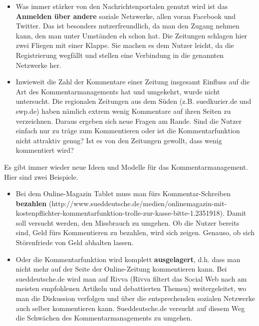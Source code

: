 \begin{itemize}
\item Was immer stärker von den Nachrichtenportalen genutzt wird ist das
{\bfseries Anmelden über andere} soziale Netzwerke, allen voran Facebook und Twitter. Das ist besonders nutzerfreundlich, da man den Zugang nehmen kann, den man unter Umständen eh schon hat. Die Zeitungen schlagen hier zwei Fliegen mit einer Klappe. Sie machen es dem Nutzer leicht, da die Registrierung wegfällt und stellen eine Verbindung in die genannten Netzwerke her. 

\item Inwieweit die Zahl der Kommentare einer Zeitung insgesamt Einfluss auf die Art des Kommentarmanagements hat und umgekehrt, wurde nicht
untersucht. Die regionalen Zeitungen aus dem Süden (z.B. suedkurier.de und swp.de) haben nämlich extrem wenig Kommentare auf ihren Seiten zu verzeichnen. 
Daraus ergeben sich neue Fragen am Rande. Sind die Nutzer einfach nur zu träge zum Kommentieren oder
ist die Kommentarfunktion nicht attraktiv genug? Ist es von den Zeitungen gewollt, dass wenig kommentiert wird? 

\end{itemize}




Es gibt immer wieder neue Ideen und Modelle für das Kommentarmanagement. Hier sind zwei Beispiele.
\begin{itemize}
\item Bei dem Online-Magazin \glqq Tablet\grqq\- muss man fürs Kommentar-Schreiben {\bfseries bezahlen} (http://www.sueddeutsche.de/\-me\-dien/onlinemagazin-mit-kostenpflichter-kommentarfunktion-trolle-zur-kasse-bitte-1.2351918).
Damit soll versucht werden, den Missbrauch zu umgehen. Ob die Nutzer bereits sind, Geld fürs Kommentieren zu bezahlen, wird sich zeigen. Genauso, ob sich Störenfriede von Geld abhalten lassen.


\item Oder die Kommentarfunktion wird komplett {\bfseries ausgelagert}, d.h. dass man nicht mehr auf der Seite der Online-Zeitung kommentieren kann. Bei sueddeutsche.de wird man auf \glqq Rivva\grqq\- (Rivva filtert das Social Web nach am meisten empfohlenen Artikeln und debattierten Themen) weitergeleitet, wo man die Diskussion verfolgen und über die entsprechenden sozialen Netzwerke auch selber kommentieren kann. Sueddeutsche.de versucht auf diesem Weg die Schwächen des Kommentarmanagements zu umgehen. 

\end{itemize}